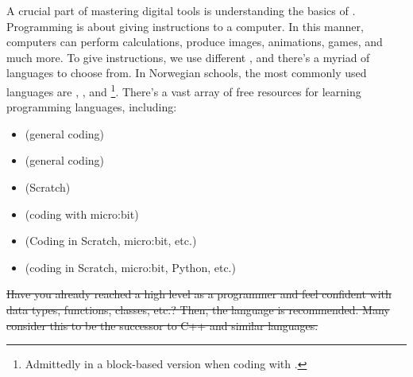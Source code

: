 




A crucial part of mastering digital tools is understanding the basics of .
Programming is about giving instructions to a computer. In this manner, computers can perform calculations, produce images, animations, games, and much more. To give instructions, we use different , and there's a myriad of languages to choose from. In Norwegian schools, the most commonly used languages are , , and \footnote{Admittedly in a block-based version when coding with .}. There's a vast array of free resources for learning programming languages, including:

\begin{itemize}
	\item {} (general coding)
	\item {} (general coding)
	\item {} (Scratch)
	\item {} (coding with micro:bit)
	\item {} (Coding in Scratch, micro:bit, etc.)
	\item {} (coding in Scratch, micro:bit, Python, etc.)
\end{itemize} \vsk

\st{Have you already reached a high level as a programmer and feel confident with data types, functions, classes, etc.? Then, the language  is recommended. Many consider this to be the successor to C++ and similar languages.}




